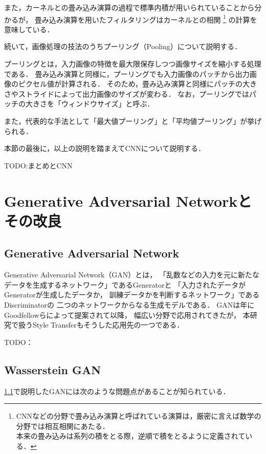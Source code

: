 \documentclass[\homedir/main.tex]{subfiles}
\begin{document}
また，カーネルとの畳み込み演算の過程で標準内積が用いられていることから分かるが，
畳み込み演算を用いたフィルタリングはカーネルとの相関
\footnote{
    CNNなどの分野で畳み込み演算と呼ばれている演算は，厳密に言えば数学の分野では相互相関にあたる．\\
    本来の畳み込みは系列の積をとる際，逆順で積をとるように定義されている．
}
の計算を意味している．

続いて，画像処理の技法のうちプーリング（Pooling）について説明する．

プーリングとは，入力画像の特徴を最大限保存しつつ画像サイズを縮小する処理である．
畳み込み演算と同様に，プーリングでも入力画像のパッチから出力画像のピクセル値が計算される．
そのため，畳み込み演算と同様にパッチの大きさやストライドによって出力画像のサイズが変わる．
なお，プーリングではパッチの大きさを「ウィンドウサイズ」と呼ぶ．

また，代表的な手法として「最大値プーリング」と「平均値プーリング」が挙げられる．

本節の最後に，以上の説明を踏まえてCNNについて説明する．

TODO:まとめとCNN

\section{Generative Adversarial Networkとその改良}\label{sec:gan_and_its_improvements}
\subsection{Generative Adversarial Network}\label{sec:gan}
Generative Adversarial Network（GAN）とは，
「乱数などの入力を元に新たなデータを生成するネットワーク」であるGeneratorと
「入力されたデータがGeneratorが生成したデータか，
訓練データかを判断するネットワーク」であるDiscriminatorの
二つのネットワークからなる生成モデルである．
GANは\citeyear{NIPS2014_5ca3e9b1}年に
Goodfellowら\cite{NIPS2014_5ca3e9b1}によって提案されて以降，
幅広い分野で応用されてきたが，
本研究で扱うStyle Transferもそうした応用先の一つである．


TODO：



\subsection{Wasserstein GAN}\label{sec:wgan}
\cref{sec:gan}で説明したGANには次のような問題点があることが知られている．
\end{document}
